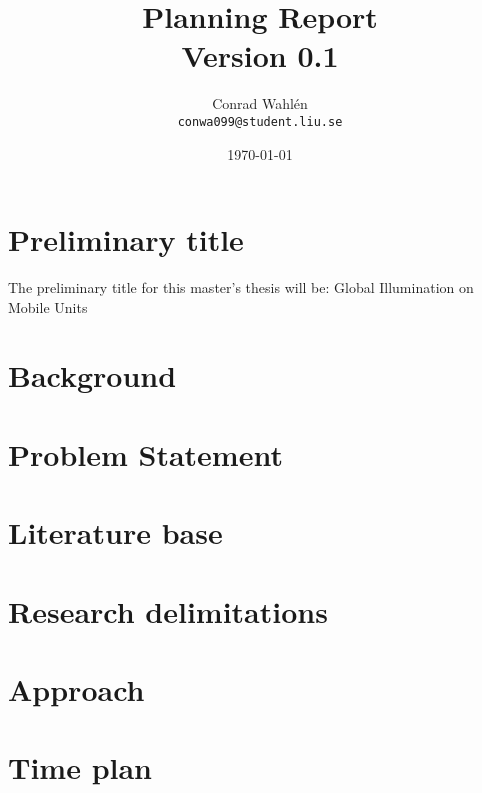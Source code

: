 \documentclass[a4paper, 12pt]{article}
\title{Planning Report \\ \small{Version 0.1}}
\author{Conrad Wahlén \\ \texttt{conwa099@student.liu.se}}
\date{\today}
\begin{document}
\maketitle
\thispagestyle{empty}
\newpage


\section{Preliminary title}
\label{sec:Preliminary title}

The preliminary title for this master's thesis will be:
Global Illumination on Mobile Units

\section{Background}
\label{sec:Background}



\section{Problem Statement}
\label{sec:Problem Statement}

\section{Literature base}
\label{sec:Literature base}

\section{Research delimitations}
\label{sec:Research delimitations}

\section{Approach}
\label{sec:Approach}

\section{Time plan}
\label{sec:Time plan}




\end{document}
